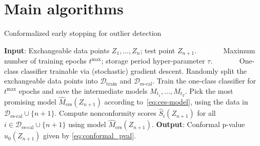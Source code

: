 \section{Main algorithms} \label{app:algorithms}

\begin{algorithm}[H]
    \caption{Conformalized early stopping for outlier detection}
    \label{alg:od_full_seq}
    \begin{algorithmic}[1]
        \STATE \textbf{Input}: Exchangeable data points $Z_1, \ldots, Z_n$; test point $Z_{n+1}$.
        \STATE \textcolor{white}{\textbf{Input}:} Maximum number of training epochs $t^{\max}$; storage period hyper-parameter $\tau$.
        \STATE \textcolor{white}{\textbf{Input}:} One-class classifier trainable via (stochastic) gradient descent.
        \STATE Randomly split the exchangeable data points into $\mathcal{D}_{\text{train}}$ and $\mathcal{D}_{\text{es-cal}}$.
        \STATE Train the one-class classifier for $t^{\text{max}}$ epochs and save the intermediate models $M_{t_1} , \dots, M_{t_T}$.
        \STATE Pick the most promising model $\hat{M}_{\text{ces}}(Z_{n+1})$ according to~\eqref{eq:ces-model}, using the data in $\mathcal{D}_{\text{es-cal}} \cup \{n+1\}$.
        \STATE Compute nonconformity scores $\hat{S}_i(Z_{n+1})$ for all $i \in \mathcal{D}_{\text{es-cal}} \cup \{n+1\}$ using model $\hat{M}_{\text{ces}}(Z_{n+1})$.
        \STATE \textbf{Output}: Conformal p-value $\hat{u}_0(Z_{n+1})$ given by \eqref{eq:conformal_pval}.
    \end{algorithmic}
\end{algorithm}

